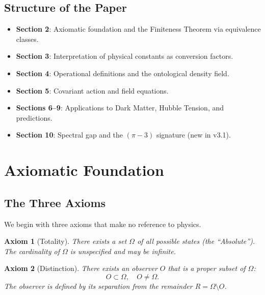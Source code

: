 \documentclass[12pt, a4paper]{article}
\newtheorem{axiom}{Axiom}
\begin{document}
\subsection{Structure of the Paper}

\begin{itemize}
    \item \textbf{Section 2}: Axiomatic foundation and the Finiteness Theorem via equivalence classes.
    \item \textbf{Section 3}: Interpretation of physical constants as conversion factors.
    \item \textbf{Section 4}: Operational definitions and the ontological density field.
    \item \textbf{Section 5}: Covariant action and field equations.
    \item \textbf{Sections 6--9}: Applications to Dark Matter, Hubble Tension, and predictions.
    \item \textbf{Section 10}: Spectral gap and the $(\pi-3)$ signature (new in v3.1).
\end{itemize}


\section{Axiomatic Foundation}

\subsection{The Three Axioms}

We begin with three axioms that make no reference to physics.

\begin{axiom}[Totality]
There exists a set $\Omega$ of all possible states (the ``Absolute''). The cardinality of $\Omega$ is unspecified and may be infinite.
\end{axiom}

\begin{axiom}[Distinction]
There exists an observer $O$ that is a proper subset of $\Omega$:
\begin{equation}
    O \subset \Omega, \quad O \neq \Omega.
\end{equation}
The observer is defined by its separation from the remainder $R = \Omega \setminus O$.
\end{axiom}
\end{document}
